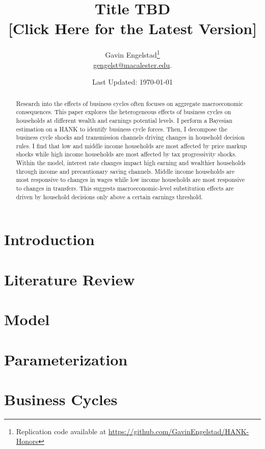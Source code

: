 \documentclass[11pt]{article}
\title{Title TBD\\{\large [Click Here for the Latest Version]}}
\author{Gavin Engelstad\thanks{Replication code available at \url{https://github.com/GavinEngelstad/HANK-Honors}} \\ \href{mailto:gengelst@macalester.edu}{gengelst@macalester.edu}.}
\date{Last Updated: \today}
\numberwithin{equation}{section} %
\numberwithin{figure}{section} %
\numberwithin{table}{section} %
\begin{document}
\maketitle

\begin{abstract}
  Research into the effects of business cycles often focuses on aggregate macroeconomic consequences. This paper explores the heterogeneous effects of business cycles on households at different wealth and earnings potential levels. I perform a Bayesian estimation on a HANK to identify business cycle forces. Then, I decompose the business cycle shocks and transmission channels driving changes in household decision rules. I find that low and middle income households are most affected by price markup shocks while high income households are most affected by tax progressivity shocks. Within the model, interest rate changes impact high earning and wealthier households through income and precautionary saving channels. Middle income households are most responsive to changes in wages while low income households are most responsive to changes in transfers. This suggests macroeconomic-level substitution effects are driven by household decisions only above a certain earnings threshold. 
\end{abstract}


\section{Introduction} \label{sec:intro}


\section{Literature Review} \label{sec:lit-review}


\section{Model}
 \label{sec:model}

\section{Parameterization} \label{sec:params}


\section{Business Cycles} \label{sec:buis-cycs}

\end{document}
